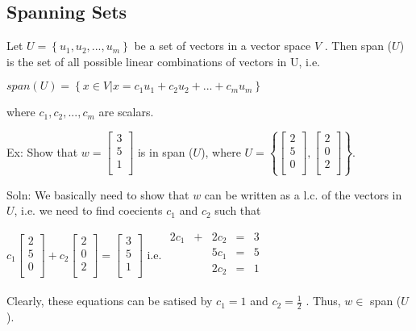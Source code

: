 \documentclass{extarticle}
\begin{document}
\begin{tcolorbox}[enhanced jigsaw,sharp corners,coltext=black,colback=BurntOrange!25!white,boxrule=0pt,breakable,size=minimal]

\subsection{Spanning Sets}
Let $U = \left\{u_1,u_2,...,u_m\right\}$ be a set of vectors in a vector space $V$ . Then span ($U$) is the set of all possible linear combinations of vectors in U, i.e.

$span (U) = \left\{x \in V | x = c_1u_1 + c_2u_2 + ... + c_mu_m \right\}$

where $c_1, c_2,...,c_m$ are scalars.

Ex: Show that $w = \left[ \begin{matrix}3\\5\\1\\\end{matrix} \right]$ is in span ($U$), where $U = \left\{ \left[ \begin{matrix}2\\5\\0\\\end{matrix}\right], \left[ \begin{matrix}2\\0\\2\\\end{matrix}\right] \right\} $.

Soln: We basically need to show that $w$ can be written as a l.c. of the vectors in $U$, i.e. we need to find coecients $c_1$ and $c_2$ such that

$c_1 \left[ \begin{matrix}2\\5\\0\\\end{matrix} \right] + c_2 \left[ \begin{matrix}2\\0\\2\\\end{matrix} \right] = \left[ \begin{matrix}3\\5\\1\\\end{matrix} \right]$
i.e.
$\begin{matrix} 2c_1&+&2c_2&=&3\\&&5c_1&=&5\\&&2c_2&=&1\\ \end{matrix}$

Clearly, these equations can be satised by $c_1 = 1$ and $c_2 = \frac{1}{2}$ . Thus, $w \in$ span ($U$).

\end{tcolorbox}
\end{document}

